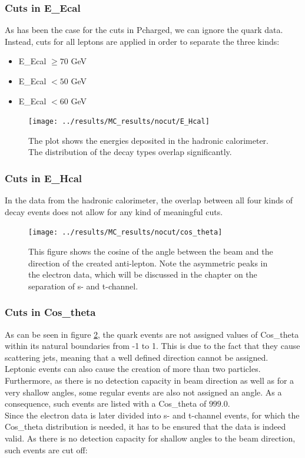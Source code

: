 \subsubsection{Cuts in E\_Ecal}
As has been the case for the cuts in Pcharged, we can ignore the quark data. Instead, cuts for all leptons are applied in order to separate the three kinds:

\begin{itemize}
	\item{ E\_Ecal $\ge70$ GeV}
	\item{ E\_Ecal $<50$ GeV}
	\item{ E\_Ecal $<60$ GeV}
\end{itemize}

\newpage
\begin{figure}[H]
\centering
\texttt{[image: ../results/MC\_results/nocut/E\_Hcal]}
\caption[E\_Hcal in simulation data]{The plot shows the energies deposited in the hadronic calorimeter. The distribution of the decay types overlap significantly.}
\label{fig:E_Hcal}
\end{figure}

\subsubsection{Cuts in E\_Hcal}
In the data from the hadronic calorimeter, the overlap between all four kinds of decay events does not allow for any kind of meaningful cuts.

\newpage
\begin{figure}[H]
\centering
\texttt{[image: ../results/MC\_results/nocut/cos\_theta]}
\caption[Cos\_theta in simulation data]{This figure shows the cosine of the angle between the beam and the direction of the created anti-lepton. Note the asymmetric peaks in the electron data, which will be discussed in the chapter on the separation of s- and t-channel.}
\label{fig:cos_theta}
\end{figure}

\subsubsection{Cuts in Cos\_theta}
As can be seen in figure \ref{fig:cos_theta}, the quark events are not assigned values of Cos\_theta within its natural boundaries from -1 to 1. This is due to the fact that they cause scattering jets, meaning that a well defined direction cannot be assigned. Leptonic events can also cause the creation of more than two particles. Furthermore, as there is no detection capacity in beam direction as well as for a very shallow angles, some regular events are also not assigned an angle. As a consequence, such events are listed with a Cos\_theta of $999.0$.\\
Since the electron data is later divided into s- and t-channel events, for which the Cos\_theta distribution is needed, it has to be ensured that the data is indeed valid. As there is no detection capacity for shallow angles to the beam direction, such events are cut off:

